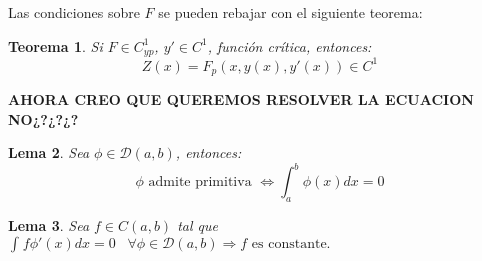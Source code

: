 \documentclass[12pt]{article}
\newtheorem{theorem}{Teorema}[section]
\newtheorem{lemma}[theorem]{Lema}
\theoremstyle{definition}
\theoremstyle{remark}
\newcommand{\integral}[3]{\displaystyle\int_{ #1 }^{ #2 } #3 }
\newcommand{\espacio}{\;\;\;}
\begin{document}
Las condiciones sobre $F$ se pueden rebajar con el siguiente teorema:

\begin{theorem} 

Si $F\in C^1_{yp}$, $y'\in C^1$, función crítica, entonces:
\[
Z(x)=F_p(x,y(x),y'(x))\in C^1
\]
\end{theorem}

\textbf{AHORA CREO QUE QUEREMOS RESOLVER LA ECUACION NO¿?¿?¿?}


\begin{lemma}
Sea $\phi\in\mathcal{D}(a,b)$, entonces:
\[
\phi \text{ admite primitiva } \Longleftrightarrow \integral{a}{b}{\phi(x)dx}=0
\]
\end{lemma}

\begin{lemma}
Sea $f\in C(a,b)$ tal que $\integral{}{}{f\phi'(x)dx=0}\espacio\forall\phi\in\mathcal{D}(a,b)\Longrightarrow f \text{ es constante.}$
\end{lemma}
\end{document}
